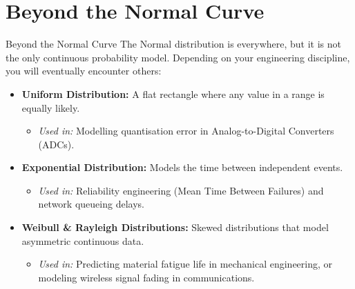 \section{Beyond the Normal Curve}
\begin{frame}{Beyond the Normal Curve}
    The Normal distribution is everywhere, but it is not the only continuous probability model. Depending on your engineering discipline, you will eventually encounter others:

    \vspace{0.2cm}
    \begin{itemize}
        \item \textbf{Uniform Distribution:} A flat rectangle where any value in a range is equally likely. 
        \begin{itemize}
            \item \textit{Used in:} Modelling quantisation error in Analog-to-Digital Converters (ADCs).
        \end{itemize}
        
        \vspace{0.2cm}
        \item \textbf{Exponential Distribution:} Models the time between independent events.
        \begin{itemize}
            \item \textit{Used in:} Reliability engineering (Mean Time Between Failures) and network queueing delays.
        \end{itemize}
        
        \vspace{0.2cm}
        \item \textbf{Weibull \& Rayleigh Distributions:} Skewed distributions that model asymmetric continuous data.
        \begin{itemize}
            \item \textit{Used in:} Predicting material fatigue life in mechanical engineering, or modeling wireless signal fading in communications.
        \end{itemize}
    \end{itemize}

\end{frame}

